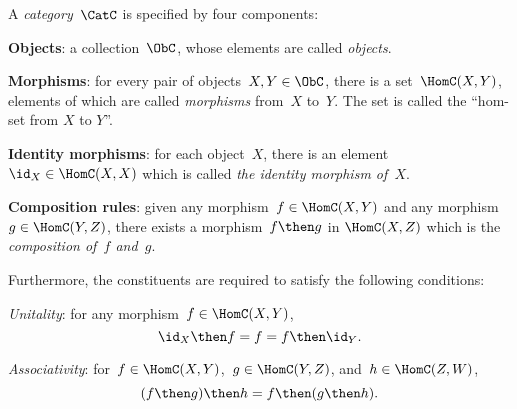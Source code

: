 \begin{ctdefinition}[Category] \label{def:categorymain}
A \emph{category}~$\CatC$ is specified by four components:
\begin{compactenum}
\item \textbf{Objects}: a collection\footnotemark~$\ObC$, whose elements are called \emph{objects}.
\item \textbf{Morphisms}: for every pair of objects~$X,Y\in \ObC$, there is a set~$\HomC(X,Y)$, elements of which are called
\emph{morphisms} from~$X$ to~$Y$. The set is called the ``hom-set from $X$ to $Y$''.
\item \textbf{Identity morphisms}: for each object~$X$, there is
an element~$\id_X \in \HomC(X,X) $ which is called \emph{the identity
morphism of~$X$}.
\item \textbf{Composition rules}: given any morphism~$f \in  \HomC(X,Y)$ and any morphism~$g \in \HomC(Y, Z)$, there exists a morphism~$f\then g$ in $\HomC(X,Z)$ which is the \emph{composition of~$f$ and~$g$}.
\end{compactenum}

Furthermore, the constituents are required to satisfy the following conditions:
\begin{compactenum}
    \item \emph{Unitality}: for any morphism~$f\in\HomC(X,Y)$,
    \begin{equation}
        \id_X \then f= f = f \then \id_Y.
    \end{equation}
    \item \emph{Associativity}: for~$f\in \HomC(X,Y)$,~$g\in \HomC(Y,Z)$, and~$h\in \HomC(Z,W)$,
    \begin{equation}
        (f\then g)\then h= f \then (g \then h).
    \end{equation}
\end{compactenum}
\end{ctdefinition}


